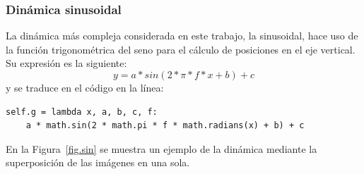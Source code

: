 \subsubsection{Dinámica sinusoidal}
La dinámica más compleja considerada en este trabajo, la sinusoidal, hace uso de la función trigonométrica del seno para el cálculo de posiciones en el eje vertical. Su expresión es la siguiente:
$$y = a*sin(2*\pi*f*x + b) + c$$
y se traduce en el código en la línea:
\vspace{10pt}
\begin{lstlisting}[frame=single]
  self.g = lambda x, a, b, c, f: 
    a * math.sin(2 * math.pi * f * math.radians(x) + b) + c
\end{lstlisting}

En la Figura~\ref{fig.sin} se muestra un ejemplo de la dinámica mediante la superposición de las imágenes en una sola.

